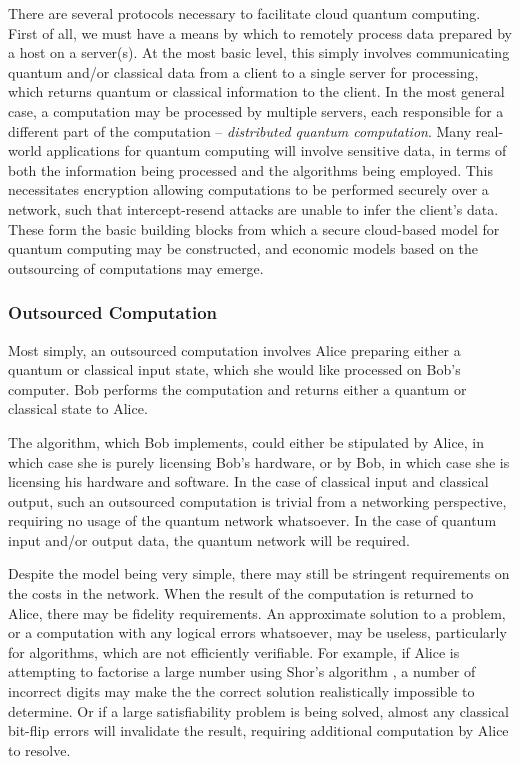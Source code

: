 \documentclass[aps,rmp,twocolumn,amsmath,amssymb,nofootinbib,superscriptaddress]{revtex4}
\begin{document}
There are several protocols necessary to facilitate cloud quantum computing. First of all, we must have a means by which to remotely process data prepared by a host on a server(s). At the most basic level, this simply involves communicating quantum and/or classical data from a client to a single server for processing, which returns quantum or classical information to the client. In the most general case, a computation may be processed by multiple servers, each responsible for a different part of the computation -- \emph{distributed quantum computation}. Many real-world applications for quantum computing will involve sensitive data, in terms of both the information being processed and the algorithms being employed. This necessitates encryption allowing computations to be performed securely over a network, such that intercept-resend attacks are unable to infer the client's data. These form the basic building blocks from which a secure cloud-based model for quantum computing may be constructed, and economic models based on the outsourcing of computations may emerge.

%
%

\subsubsection{Outsourced Computation}

Most simply, an outsourced computation involves Alice preparing either a quantum or classical input state, which she would like processed on Bob's computer. Bob performs the computation and returns either a quantum or classical state to Alice.

The algorithm, which Bob implements, could either be stipulated by Alice, in which case she is purely licensing Bob's hardware, or by Bob, in which case she is licensing his hardware and software. In the case of classical input and classical output, such an outsourced computation is trivial from a networking perspective, requiring no usage of the quantum network whatsoever. In the case of quantum input and/or output data, the quantum network will be required.

Despite the model being very simple, there may still be stringent requirements on the costs in the network. When the result of the computation is returned to Alice, there may be fidelity requirements. An approximate solution to a problem, or a computation with any logical errors whatsoever, may be useless, particularly for algorithms, which are not efficiently verifiable. For example, if Alice is attempting to factorise a large number using Shor's algorithm \cite{bib:ShorFactor}, a number of incorrect digits may make the the correct solution realistically impossible to determine. Or if a large satisfiability problem is being solved, almost any classical bit-flip errors will invalidate the result, requiring additional computation by Alice to resolve.
\end{document}
